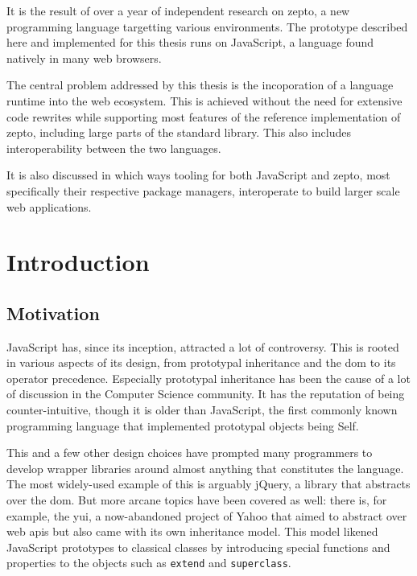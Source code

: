 \documentclass[oneside,11pt,xetex]{scrbook}
\begin{document}
It is the result of over a year of independent research on zepto, a new programming language
targetting various environments. The prototype described here and implemented for this
thesis runs on JavaScript, a language found natively in many web browsers.

The central problem addressed by this thesis is the incoporation of a language runtime
into the web ecosystem. This is achieved without the need for extensive code rewrites
while supporting most features of the reference implementation of zepto, including large
parts of the standard library. This also includes interoperability between the two languages.

It is also discussed in which ways tooling for both JavaScript and zepto, most specifically
their respective package managers, interoperate to build larger scale web applications.

\tableofcontents

\printglossary[type=\acronymtype,title=Abbreviations]

\mainmatter

\pagestyle{headings}

\chapter{Introduction}
\label{chap:intro}

\section{Motivation}
\label{sec:Motivation}

JavaScript has, since its inception, attracted a lot of controversy. This is rooted
in various aspects of its design, from prototypal inheritance and the \gls{dom} to
its operator precedence. Especially prototypal inheritance  has been the cause
of a lot of discussion in the Computer Science community. It has the reputation of
being counter-intuitive, though it is older than JavaScript, the first commonly known
programming language that implemented prototypal objects being Self.

This and a few other design choices have prompted many programmers to develop
wrapper libraries around almost anything that constitutes the language. The most widely-used
example of this is arguably jQuery, a library that abstracts over the \gls{dom}.
But more arcane topics have been covered as well: there is, for example, the \gls{yui}, a now-abandoned
project of Yahoo that aimed to abstract over web \glspl{api} but also came with
its own inheritance model. This model likened JavaScript prototypes to classical classes by
introducing special functions and properties to the objects such as \texttt{extend}
and \texttt{superclass}.
\end{document}
